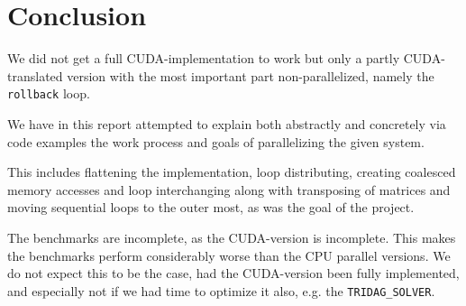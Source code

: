 \section{Conclusion}

We did not get a full CUDA-implementation to work but only a partly CUDA-translated version with the most important part non-parallelized, namely the \texttt{rollback} loop.

We have in this report attempted to explain both abstractly and concretely via code examples the work process and goals of parallelizing the given system.

This includes flattening the implementation, loop distributing, creating coalesced memory accesses and loop interchanging along with transposing of matrices and moving sequential loops to the outer most, as was the goal of the project.

The benchmarks are incomplete, as the CUDA-version is incomplete. This makes the benchmarks perform considerably worse than the CPU parallel versions. We do not expect this to be the case, had the CUDA-version been fully implemented, and especially not if we had time to optimize it also, e.g. the \texttt{TRIDAG\_SOLVER}.





